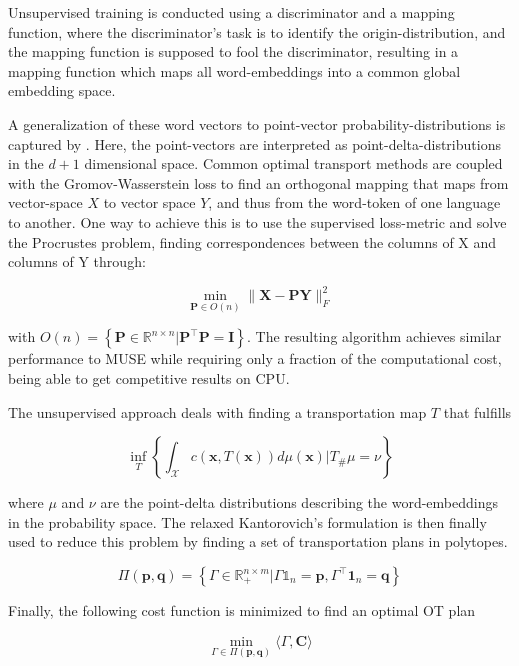 \documentclass[a4paper,12pt,oneside,openright]{report}
\begin{document}
Unsupervised training is conducted using a discriminator and a mapping function, where the discriminator's task is to identify the origin-distribution, and the mapping function is supposed to fool the discriminator, resulting in a mapping function which maps all word-embeddings into a common global embedding space.

A generalization of these word vectors to point-vector probability-distributions is captured by \cite{alvarez18}.
Here, the point-vectors are interpreted as point-delta-distributions in the $d+1$ dimensional space.
Common optimal transport methods are coupled with the Gromov-Wasserstein loss to find an orthogonal mapping that maps from vector-space $X$ to vector space $Y$, and thus from the word-token of one language to another.
One way to achieve this is to use the supervised loss-metric and solve the Procrustes problem, finding correspondences between the columns of X and columns of Y through:

\begin{equation}
\min _{\mathbf{P} \in O(n)}\|\mathbf{X}-\mathbf{P} \mathbf{Y}\|_{F}^{2}
\end{equation}

with $O(n)=\left\{\mathbf{P} \in \mathbb{R}^{n \times n} | \mathbf{P}^{\top} \mathbf{P}=\mathbf{I}\right\}$.
The resulting algorithm achieves similar performance to MUSE while requiring only a fraction of the computational cost, being able to get competitive results on CPU.

The unsupervised approach deals with finding a transportation map $T$ that fulfills

\begin{equation}
\inf _{T}\left\{\int_{\mathcal{X}} c(\mathbf{x}, T(\mathbf{x})) d \mu(\mathbf{x}) | T_{\#} \mu=\nu\right\}
\end{equation}

where $\mu$ and $\nu$ are the point-delta distributions describing the word-embeddings in the probability space.
The relaxed Kantorovich's formulation is then finally used to reduce this problem by finding a set of transportation plans in  polytopes.

$$
\Pi(\mathbf{p}, \mathbf{q})=\left\{\Gamma \in \mathbb{R}_{+}^{n \times m} | \Gamma \mathbb{1}_{n}=\mathbf{p}, \Gamma^{\top} \mathbf{1}_{n}=\mathbf{q}\right\}
$$

Finally, the following cost function is minimized to find an optimal OT plan

$$
\min _{\Gamma \in \Pi(\mathbf{p}, \mathbf{q})}\langle\Gamma, \mathbf{C}\rangle
$$
\end{document}
